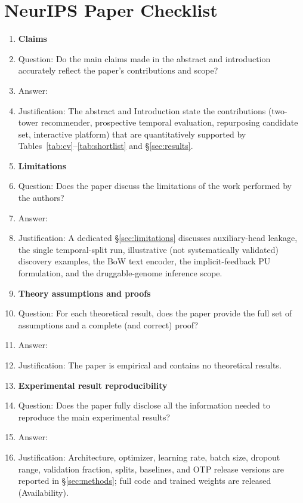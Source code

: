\section*{NeurIPS Paper Checklist}

\begin{enumerate}

\item {\bf Claims}
    \item[] Question: Do the main claims made in the abstract and introduction accurately reflect the paper's contributions and scope?
    \item[] Answer: \answerYes{}
    \item[] Justification: The abstract and Introduction state the contributions (two-tower recommender, prospective temporal evaluation, repurposing candidate set, interactive platform) that are quantitatively supported by Tables~\ref{tab:cv}--\ref{tab:shortlist} and \S\ref{sec:results}.

\item {\bf Limitations}
    \item[] Question: Does the paper discuss the limitations of the work performed by the authors?
    \item[] Answer: \answerYes{}
    \item[] Justification: A dedicated \S\ref{sec:limitations} discusses auxiliary-head leakage, the single temporal-split run, illustrative (not systematically validated) discovery examples, the BoW text encoder, the implicit-feedback PU formulation, and the druggable-genome inference scope.

\item {\bf Theory assumptions and proofs}
    \item[] Question: For each theoretical result, does the paper provide the full set of assumptions and a complete (and correct) proof?
    \item[] Answer: \answerNA{}
    \item[] Justification: The paper is empirical and contains no theoretical results.

\item {\bf Experimental result reproducibility}
    \item[] Question: Does the paper fully disclose all the information needed to reproduce the main experimental results?
    \item[] Answer: \answerYes{}
    \item[] Justification: Architecture, optimizer, learning rate, batch size, dropout range, validation fraction, splits, baselines, and OTP release versions are reported in \S\ref{sec:methods}; full code and trained weights are released (Availability).


\end{enumerate}
